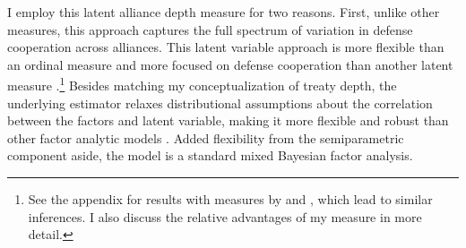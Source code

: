 \documentclass[12pt]{article}
\begin{document}
I employ this latent alliance depth measure for two reasons. 
First, unlike other measures, this approach captures the full spectrum of variation in defense cooperation across alliances.
This latent variable approach is more flexible than an ordinal measure \citep{LeedsAnac2005} and more focused on defense cooperation than another latent measure \citep{BensonClinton2016}.\footnote{See the appendix for results with measures by \citet{LeedsAnac2005} and \citet{BensonClinton2016}, which lead to similar inferences. I also discuss the relative advantages of my measure in more detail.}
Besides matching my conceptualization of treaty depth, the underlying estimator relaxes distributional assumptions about the correlation between the factors and latent variable, making it more flexible and robust than other factor analytic models \citep{Murrayetal2013}. 
Added flexibility from the semiparametric component aside, the model is a standard mixed Bayesian factor analysis. 
%
%
%
%
\end{document}
